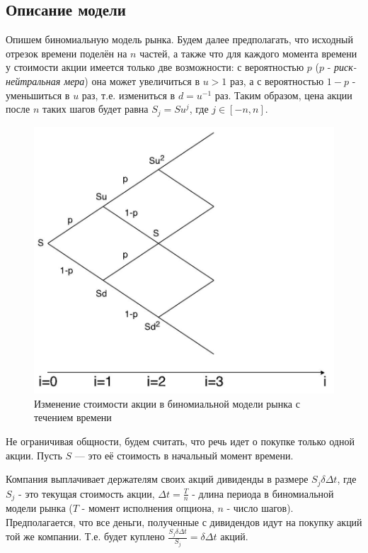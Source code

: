 \documentclass[oneside,final,12pt]{article}
\begin{document}
\subsection{Описание модели}
Опишем биномиальную модель рынка. Будем далее предполагать, что исходный отрезок времени поделён на $n$ частей, а также что для каждого момента времени у стоимости акции имеется только две возможности: с вероятностью $p$ ($p$ - \textit{риск-нейтральная мера}) она может увеличиться в $u>1$ раз, а с вероятностью $1-p$ - уменьшиться в $u$ раз, т.е. измениться в $d = u^{-1}$ раз. Таким образом, цена акции после $n$ таких шагов будет равна $S_j = S u^j$, где $j \in [-n, n]$.

\begin{figure}[h]
    \centering
    \includegraphics[scale=0.6]{scheme.jpg}
    \caption{Изменение стоимости акции в биномиальной модели рынка с течением времени}
    \label{binomial}
\end{figure}


Не ограничивая общности, будем считать, что речь идет о покупке только одной акции. Пусть $S$ --- это её стоимость в начальный момент времени.

Компания выплачивает держателям своих акций дивиденды в размере $S_j \delta \Delta t$, где $S_j$ - это текущая стоимость акции, $\Delta t = \frac{T}{n}$ - длина периода в биномиальной модели рынка ($T$ - момент исполнения опциона, $n$ - число шагов). Предполагается, что все деньги, полученные с дивидендов идут на покупку акций той же компании. Т.е. будет куплено $\frac{S_j \delta \Delta t}{S_j} = \delta \Delta t$ акций.
\end{document}
